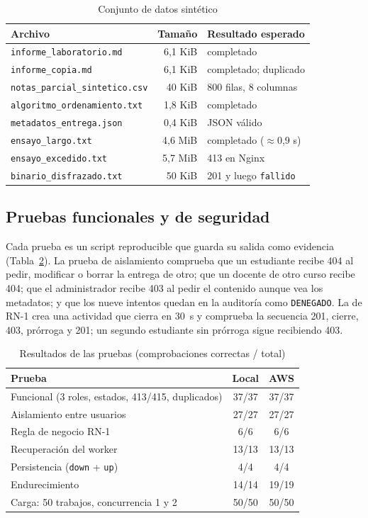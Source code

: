 \documentclass[conference,a4paper]{IEEEtran}
\newcommand{\cod}[1]{\texttt{#1}}
\begin{document}
\begin{table}[!t]
\caption{Conjunto de datos sintético}\label{tab:dataset}
\centering\footnotesize
\setlength{\tabcolsep}{4pt}
\begin{tabular}{@{}l r l@{}}
\toprule
Archivo & Tamaño & Resultado esperado\\
\midrule
\cod{informe\_laboratorio.md} & 6,1 KiB & completado\\
\cod{informe\_copia.md} & 6,1 KiB & completado; duplicado\\
\cod{notas\_parcial\_sintetico.csv} & 40 KiB & 800 filas, 8 columnas\\
\cod{algoritmo\_ordenamiento.txt} & 1,8 KiB & completado\\
\cod{metadatos\_entrega.json} & 0,4 KiB & JSON válido\\
\cod{ensayo\_largo.txt} & 4,6 MiB & completado ($\approx$0,9 s)\\
\cod{ensayo\_excedido.txt} & 5,7 MiB & 413 en Nginx\\
\cod{binario\_disfrazado.txt} & 50 KiB & 201 y luego \cod{fallido}\\
\bottomrule
\end{tabular}
\end{table}

\subsection{Pruebas funcionales y de seguridad}
Cada prueba es un script reproducible que guarda su salida como evidencia (Tabla~\ref{tab:pruebas}). La prueba de aislamiento comprueba que un estudiante recibe 404 al pedir, modificar o borrar la entrega de otro; que un docente de otro curso recibe 404; que el administrador recibe 403 al pedir el contenido aunque vea los metadatos; y que los nueve intentos quedan en la auditoría como \cod{DENEGADO}. La de RN-1 crea una actividad que cierra en 30~s y comprueba la secuencia 201, cierre, 403, prórroga y 201; un segundo estudiante sin prórroga sigue recibiendo 403.

\begin{table}[!t]
\caption{Resultados de las pruebas (comprobaciones correctas / total)}\label{tab:pruebas}
\centering\footnotesize
\begin{tabular}{@{}l c c@{}}
\toprule
Prueba & Local & AWS\\
\midrule
Funcional (3 roles, estados, 413/415, duplicados) & 37/37 & 37/37\\
Aislamiento entre usuarios & 27/27 & 27/27\\
Regla de negocio RN-1 & 6/6 & 6/6\\
Recuperación del worker & 13/13 & 13/13\\
Persistencia (\cod{down} + \cod{up}) & 4/4 & 4/4\\
Endurecimiento & 14/14 & 19/19\\
Carga: 50 trabajos, concurrencia 1 y 2 & 50/50 & 50/50\\
\bottomrule
\end{tabular}
\end{table}
\end{document}

